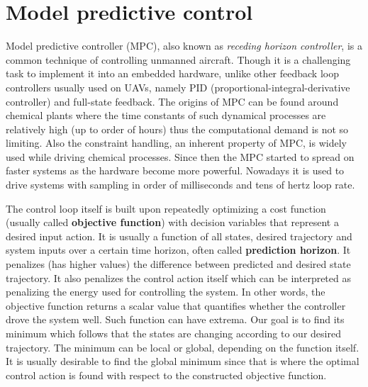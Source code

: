 \section{Model predictive control}
\label{cap:mpc_theory}

Model predictive controller (MPC), also known as \textit{receding horizon controller}, is a common technique of controlling unmanned aircraft. Though it is a challenging task to implement it into an embedded hardware, unlike other feedback loop controllers usually used on UAVs, namely PID (proportional-integral-derivative controller) and full-state feedback. The origins of MPC can be found around chemical plants where the time constants of such dynamical processes are relatively high (up to order of hours) thus the computational demand is not so limiting. Also the constraint handling, an inherent property of MPC, is widely used while driving chemical processes. Since then the MPC started to spread on faster systems as the hardware become more powerful. Nowadays it is used to drive systems with sampling in order of milliseconds and tens of hertz loop rate.

The control loop itself is built upon repeatedly optimizing a cost function (usually called \textbf{objective function}) with decision variables that represent a desired input action. It is usually a function of all states, desired trajectory and system inputs over a certain time horizon, often called \textbf{prediction horizon}. It penalizes (has higher values) the difference between predicted and desired state trajectory. It also penalizes the control action itself which can be interpreted as penalizing the energy used for controlling the system. In other words, the objective function returns a scalar value that quantifies whether the controller drove the system well. Such function can have extrema. Our goal is to find its minimum which follows that the states are changing according to our desired trajectory. The minimum can be local or global, depending on the function itself. It is usually desirable to find the global minimum since that is where the optimal control action is found with respect to the constructed objective function.

